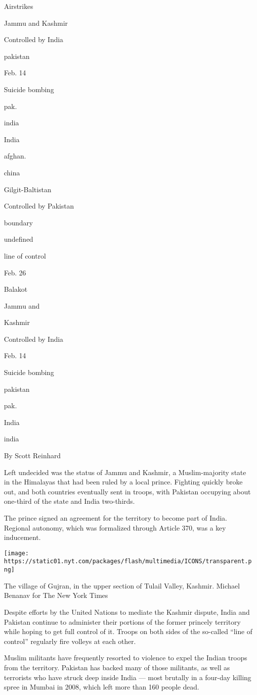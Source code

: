 Airstrikes

Jammu and Kashmir

Controlled by India

pakistan

Feb. 14

Suicide bombing

pak.

india

India

afghan.

china

Gilgit-Baltistan

Controlled by Pakistan

boundary

undefined

line of control

Feb. 26

Balakot

Jammu and

Kashmir

Controlled by India

Feb. 14

Suicide bombing

pakistan

pak.

India

india

By Scott Reinhard

Left undecided was the status of Jammu and Kashmir, a Muslim-majority
state in the Himalayas that had been ruled by a local prince. Fighting
quickly broke out, and both countries eventually sent in troops, with
Pakistan occupying about one-third of the state and India two-thirds.

The prince signed an agreement for the territory to become part of
India. Regional autonomy, which was formalized through Article 370, was
a key inducement.

\texttt{[image: https://static01.nyt.com/packages/flash/multimedia/ICONS/transparent.png]}

The village of Gujran, in the upper section of Tulail Valley, Kashmir.
Michael Benanav for The New York Times

Despite efforts by the United Nations to mediate the Kashmir dispute,
India and Pakistan continue to administer their portions of the former
princely territory while hoping to get full control of it. Troops on
both sides of the so-called ``line of control'' regularly fire volleys
at each other.

Muslim militants have frequently resorted to violence to expel the
Indian troops from the territory. Pakistan has backed many of those
militants, as well as terrorists who have struck deep inside India ---
most brutally in a four-day killing spree in Mumbai in 2008, which left
more than 160 people dead.

